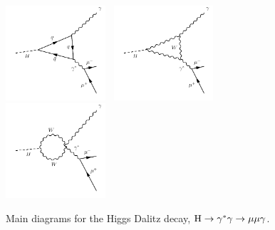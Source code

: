 \begin{figure}[!ht]
  \begin{center}  
    \includegraphics[width=0.33\textwidth]{Fig/HDalitz_1}~
    \includegraphics[width=0.33\textwidth]{Fig/HDalitz_2}~
    \includegraphics[width=0.33\textwidth]{Fig/HDalitz_3}\\
    \caption{Main diagrams for the Higgs Dalitz decay, $\mathrm{H}\to\gamma^{*}\gamma\to\mu\mu\gamma$. \label{fig:FeynmanDiagrams_Dalitz}}  
  \end{center}
\end{figure} 

